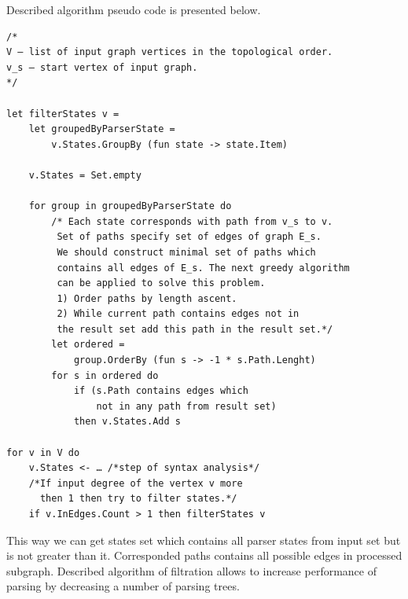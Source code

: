\documentclass{llncs}
\begin{document}
Described algorithm pseudo code is presented below.
\begin{verbatim}
/*
V – list of input graph vertices in the topological order.
v_s – start vertex of input graph.
*/

let filterStates v =
    let groupedByParserState =
        v.States.GroupBy (fun state -> state.Item)

    v.States = Set.empty

    for group in groupedByParserState do
        /* Each state corresponds with path from v_s to v.
         Set of paths specify set of edges of graph E_s.
         We should construct minimal set of paths which
         contains all edges of E_s. The next greedy algorithm
         can be applied to solve this problem.
         1) Order paths by length ascent.
         2) While current path contains edges not in
         the result set add this path in the result set.*/
        let ordered = 
            group.OrderBy (fun s -> -1 * s.Path.Lenght)
        for s in ordered do
            if (s.Path contains edges which 
                not in any path from result set) 
            then v.States.Add s

for v in V do
    v.States <- … /*step of syntax analysis*/
    /*If input degree of the vertex v more 
      then 1 then try to filter states.*/
    if v.InEdges.Count > 1 then filterStates v

\end{verbatim}

This way we can get states set which contains all parser states from input set but is not greater 
than it. Corresponded paths contains all possible edges in processed subgraph. Described algorithm
of filtration allows to increase performance of parsing by decreasing a number of parsing trees.



\end{document}
